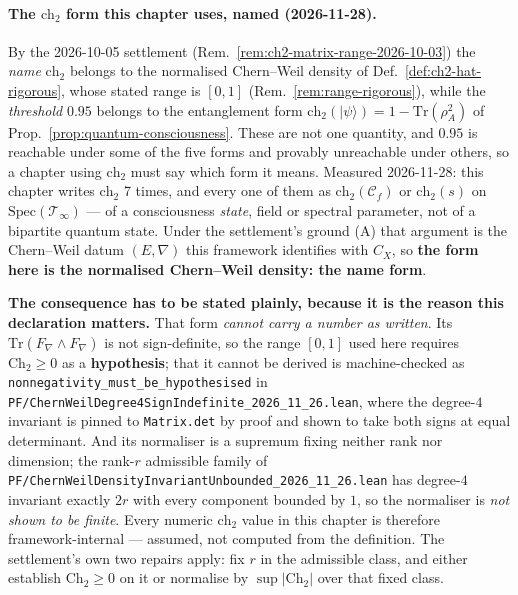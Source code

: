 \paragraph{The $\text{ch}_2$ form this chapter uses, named (2026-11-28).}
By the 2026-10-05 settlement (Rem.~\ref{rem:ch2-matrix-range-2026-10-03}) the
\emph{name} $\text{ch}_2$ belongs to the normalised Chern--Weil density of
Def.~\ref{def:ch2-hat-rigorous}, whose stated range is $[0,1]$
(Rem.~\ref{rem:range-rigorous}), while the \emph{threshold} $0.95$ belongs to the
entanglement form $\text{ch}_2(|\psi\rangle) = 1 - \mathrm{Tr}(\rho_A^2)$ of
Prop.~\ref{prop:quantum-consciousness}. These are not one quantity, and $0.95$ is
reachable under some of the five forms and provably unreachable under others, so a
chapter using $\text{ch}_2$ must say which form it means.
Measured 2026-11-28: this chapter writes $\text{ch}_2$ 7 times, and every one of them as $\text{ch}_2(\mathcal{C}_f)$ or $\text{ch}_2(s)$ on $\mathrm{Spec}(\mathcal{T}_\infty)$
--- of a consciousness \emph{state}, field or spectral parameter, not of a
bipartite quantum state. Under the settlement's ground (A) that argument is the
Chern--Weil datum $(E,\nabla)$ this framework identifies with $C_X$, so
\textbf{the form here is the normalised Chern--Weil density: the name form}.

\noindent \textbf{The consequence has to be stated plainly, because it is the
reason this declaration matters.} That form \emph{cannot carry a number as
written}. Its $\mathrm{Tr}(F_\nabla \wedge F_\nabla)$ is not sign-definite, so the
range $[0,1]$ used here requires $\mathrm{Ch}_2 \geq 0$ as a \textbf{hypothesis};
that it cannot be derived is machine-checked as
\texttt{nonnegativity\_must\_be\_hypothesised} in
\texttt{PF/ChernWeilDegree4SignIndefinite\_2026\_11\_26.lean}, where the
degree-$4$ invariant is pinned to \texttt{Matrix.det} by proof and shown to take
both signs at equal determinant. And its normaliser is a supremum fixing neither
rank nor dimension; the rank-$r$ admissible family of
\texttt{PF/ChernWeilDensityInvariantUnbounded\_2026\_11\_26.lean} has degree-$4$
invariant exactly $2r$ with every component bounded by $1$, so the normaliser is
\emph{not shown to be finite}. Every numeric $\text{ch}_2$ value in this chapter
is therefore framework-internal --- assumed, not computed from the definition.
The settlement's own two repairs apply: fix $r$ in the admissible class, and
either establish $\mathrm{Ch}_2 \geq 0$ on it or normalise by
$\sup|\mathrm{Ch}_2|$ over that fixed class.



